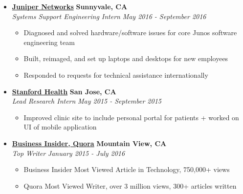 \documentclass[10pt,letterpaper]{article}
\begin{document}
\begin{itemize}
    \item[]
    {\href{https://www.juniper.net/us/en/}{\textbf{Juniper Networks}} \hfill
      \textbf{Sunnyvale, CA}}
    \\
    {\emph{Systems Support Engineering Intern} \hfill \emph{May 2016 - September 2016}}

    \begin{itemize}[label=\textbullet]
      \itemsep0em
      \item Diagnosed and solved hardware/software issues for core Junos software engineering team
      \item Built, reimaged, and set up laptops and desktops for new employees
      \item Responded to requests for technical assistance internationally
    \end{itemize}

    \item[]
    {\href{https://stanfordhealthcare.org/}{\textbf{Stanford Health}} \hfill
      \textbf{San Jose, CA}}
    \\
    {\emph{Lead Research Intern} \hfill \emph{May 2015 - September 2015}}

    \begin{itemize}[label=\textbullet]
      \itemsep0em
      \item Improved clinic site to include personal portal for patients + worked on UI of mobile application
    \end{itemize}


    \item[]
    {\href{http://www.businessinsider.com/}{\textbf{Business Insider, Quora}} \hfill
      \textbf{Mountain View, CA}}
    \\
    {\emph{Top Writer} \hfill \emph{January 2015 - July 2016}}

    \begin{itemize}[label=\textbullet]
      \itemsep0em
      \item Business Insider Most Viewed Article in Technology, 750,000+ views
      \item Quora Most Viewed Writer, over 3 million views, 300+ articles written
    \end{itemize}
  \end{itemize}


\end{document}
